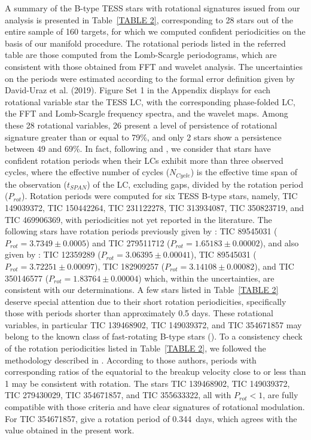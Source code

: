 \documentclass[RNAAS]{aastex63}
\begin{document}
A summary of the B-type TESS stars with rotational signatures issued from our analysis is presented in Table~\ref{TABLE 2}, corresponding to 28 stars out of the entire sample of 160 targets, for which we computed confident periodicities on the basis of our manifold procedure. The rotational periods listed in the referred table are those computed from the Lomb-Scargle periodograms, which are consistent with those obtained from FFT and wavelet analysis. The uncertainties on the periods were estimated according to the formal error definition given by David-Uraz et al. (2019). Figure Set 1 in the Appendix displays for each rotational variable star the TESS LC, with the corresponding phase-folded LC, the FFT and Lomb-Scargle frequency spectra, and the wavelet maps. Among these 28 rotational variables, 26 present a level of persistence of rotational signature greater than or equal to 79\%, and only 2 stars show a persistence between 49 and 69\%. In fact, following \citet{deMedeiros2013} and \citet{Canto2020}, we consider that stars have confident rotation periods when their LCs exhibit more than three observed cycles, where the effective number of cycles ($N_{Cycle}$) is the effective time span of the observation ($t_{SPAN}$) of the LC, excluding gaps, divided by the rotation period ($P_{rot}$). Rotation periods were computed for six TESS B-type stars, namely, TIC 149039372, TIC 150442264, TIC 231122278, TIC 313934087, TIC 350823719, and TIC 469906369, with periodicities not yet reported in the literature. The following stars have rotation periods previously given by \citet{David2019}: TIC 89545031  ($P_{rot} = 3.7349 \pm 0.0005$) and TIC 279511712 ($P_{rot} = 1.65183 \pm 0.00002$), and also given by \citet{Cunha2019}: TIC 12359289 ($P_{rot} = 3.06395 \pm 0.00041$), TIC 89545031 ($P_{rot} = 3.72251 \pm 0.00097$), TIC 182909257 ($P_{rot} = 3.14108 \pm 0.00082$), and TIC 350146577 ($P_{rot} = 1.83764 \pm 0.00004$) which, within the uncertainties, are consistent with our determinations. A few stars listed in Table~\ref{TABLE 2} deserve special attention due to their short rotation periodicities, specifically those with periods shorter than approximately 0.5 days. These rotational variables, in particular TIC 139468902, TIC 149039372, and TIC 354671857 may belong to the known class of fast-rotating B-type stars (\citealp{Mowlavi2016,Balona2016}).
To a consistency check of the rotation periodicities listed in Table~\ref{TABLE 2}, we followed the methodology described in \citet{Kochukhov2021}. According to those authors, periods with corresponding ratios of the equatorial to the breakup velocity close to or less than 1 may be consistent with rotation. The stars TIC 139468902, TIC 149039372, TIC 279430029, TIC 354671857, and TIC 355633322, all with $P_{rot} < 1$, are fully compatible with those criteria and have clear signatures of rotational modulation. For TIC 354671857, \citet{Kochukhov2021} give a rotation period of 0.344~days, which agrees with the value obtained in the present work.
\end{document}

